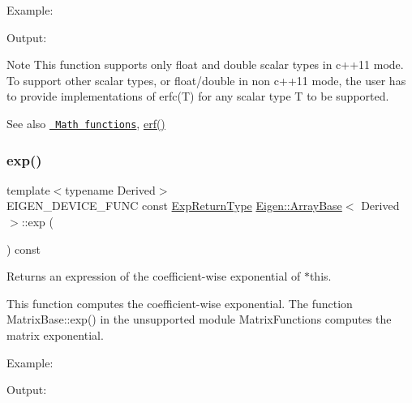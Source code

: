 Example\+: 
\begin{DoxyCodeInclude}{0}
\end{DoxyCodeInclude}
 Output\+: 
\begin{DoxyVerbInclude}
\end{DoxyVerbInclude}


\begin{DoxyNote}{Note}
This function supports only float and double scalar types in c++11 mode. To support other scalar types, or float/double in non c++11 mode, the user has to provide implementations of erfc(\+T) for any scalar type T to be supported.
\end{DoxyNote}
\begin{DoxySeeAlso}{See also}
\href{group__CoeffwiseMathFunctions.html\#cwisetable_erfc}{\texttt{ Math functions}}, \mbox{\hyperlink{class_eigen_1_1_array_base_aa63d066102c083a96f0abec99a330f60}{erf()}} 
\end{DoxySeeAlso}
\mbox{\label{class_eigen_1_1_array_base_a7b262ecb3e4db0f87d2eae85f2d64f15}} 
\subsubsection{\texorpdfstring{exp()}{exp()}}
{\footnotesize\ttfamily template$<$typename Derived$>$ \\
E\+I\+G\+E\+N\+\_\+\+D\+E\+V\+I\+C\+E\+\_\+\+F\+U\+NC const \mbox{\hyperlink{class_eigen_1_1_cwise_unary_op}{Exp\+Return\+Type}} \mbox{\hyperlink{class_eigen_1_1_array_base}{Eigen\+::\+Array\+Base}}$<$ Derived $>$\+::exp (\begin{DoxyParamCaption}{ }\end{DoxyParamCaption}) const\hspace{0.3cm}{\ttfamily [inline]}}

\begin{DoxyReturn}{Returns}
an expression of the coefficient-\/wise exponential of $\ast$this.
\end{DoxyReturn}
This function computes the coefficient-\/wise exponential. The function Matrix\+Base\+::exp() in the unsupported module Matrix\+Functions computes the matrix exponential.

Example\+: 
\begin{DoxyCodeInclude}{0}
\end{DoxyCodeInclude}
 Output\+: 
\begin{DoxyVerbInclude}
\end{DoxyVerbInclude}


